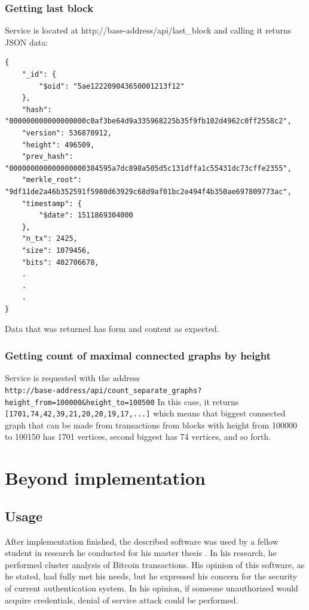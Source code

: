 \documentclass[12pt, en, eng, twoside, final]{mgr}
\begin{document}
\subsection{Getting last block}
Service is located at http://base-address/api/last\_block and calling it returns JSON data:
\begin{lstlisting}[caption=Response on last block API call]
{
    "_id": {
        "$oid": "5ae122209043650001213f12"
    },
    "hash": "000000000000000000c0af3be64d9a335968225b35f9fb102d4962c0ff2558c2",
    "version": 536870912,
    "height": 496509,
    "prev_hash": "000000000000000000384595a7dc898a505d5c131dffa1c55431dc73cffe2355",
    "merkle_root": "9df11de2a46b352591f5980d63929c68d9af01bc2e494f4b350ae697809773ac",
    "timestamp": {
        "$date": 1511869304000
    },
    "n_tx": 2425,
    "size": 1079456,
    "bits": 402706678,
    .
    .
    .
}
\end{lstlisting}

Data that was returned has form and content as expected. 

\subsection{Getting count of maximal connected graphs by height}
Service is requested with the address
\\ \verb|http://base-address/api/count_separate_graphs?height_from=100000&height_to=100500|
In this case, it returns \texttt{[1701,74,42,39,21,20,20,19,17,...]} which means that biggest connected graph that can be made from transactions from blocks with height from 100000 to 100150 has 1701 vertices, second biggest has 74 vertices, and so forth.


\chapter{Beyond implementation}

\section{Usage}
After implementation finished, the described software was used by a fellow student in research he conducted for his master thesis \cite{twardak}. In his research, he performed cluster analysis of Bitcoin transactions. His opinion of this software, as he stated, had fully met his needs, but he expressed his concern for the security of current authentication system. In his opinion, if someone unauthorized would acquire credentials, denial of service attack could be performed.
\end{document}
